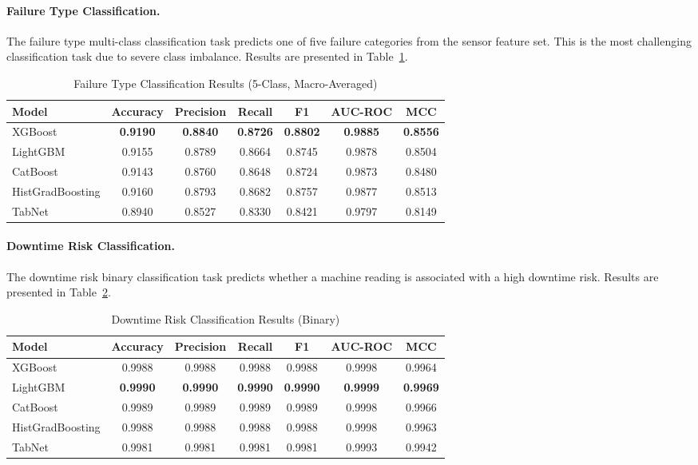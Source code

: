 \paragraph{Failure Type Classification.} The failure type multi-class classification task predicts one of five failure categories from the sensor feature set. This is the most challenging classification task due to severe class imbalance. Results are presented in Table~\ref{tab:cls_fail}.
\begin{table}[!htbp]
\centering
\caption{Failure Type Classification Results (5-Class, Macro-Averaged)}
\label{tab:cls_fail}
\begin{tabular}{lcccccc}
\hline
\textbf{Model} & \textbf{Accuracy} & \textbf{Precision} & \textbf{Recall} & \textbf{F1} & \textbf{AUC-ROC} & \textbf{MCC} \\
\hline
XGBoost              & \textbf{0.9190} & \textbf{0.8840} & \textbf{0.8726} & \textbf{0.8802} & \textbf{0.9885} & \textbf{0.8556} \\
LightGBM             & 0.9155 & 0.8789 & 0.8664 & 0.8745 & 0.9878 & 0.8504 \\
CatBoost             & 0.9143 & 0.8760 & 0.8648 & 0.8724 & 0.9873 & 0.8480 \\
HistGradBoosting     & 0.9160 & 0.8793 & 0.8682 & 0.8757 & 0.9877 & 0.8513 \\
TabNet               & 0.8940 & 0.8527 & 0.8330 & 0.8421 & 0.9797 & 0.8149 \\
\hline
\end{tabular}
\end{table}
\paragraph{Downtime Risk Classification.} The downtime risk binary classification task predicts whether a machine reading is associated with a high downtime risk. Results are presented in Table~\ref{tab:cls_down}.
\begin{table}[!htbp]
\centering
\caption{Downtime Risk Classification Results (Binary)}
\label{tab:cls_down}
\begin{tabular}{lcccccc}
\hline
\textbf{Model} & \textbf{Accuracy} & \textbf{Precision} & \textbf{Recall} & \textbf{F1} & \textbf{AUC-ROC} & \textbf{MCC} \\
\hline
XGBoost              & 0.9988 & 0.9988 & 0.9988 & 0.9988 & 0.9998 & 0.9964 \\
LightGBM             & \textbf{0.9990} & \textbf{0.9990} & \textbf{0.9990} & \textbf{0.9990} & \textbf{0.9999} & \textbf{0.9969} \\
CatBoost             & 0.9989 & 0.9989 & 0.9989 & 0.9989 & 0.9998 & 0.9966 \\
HistGradBoosting     & 0.9988 & 0.9988 & 0.9988 & 0.9988 & 0.9998 & 0.9963 \\
TabNet               & 0.9981 & 0.9981 & 0.9981 & 0.9981 & 0.9993 & 0.9942 \\
\hline
\end{tabular}
\end{table}
